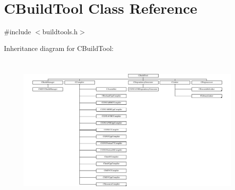 \hypertarget{classCBuildTool}{\section{C\-Build\-Tool Class Reference}
\label{classCBuildTool}
}


{\ttfamily \#include $<$buildtools.\-h$>$}

Inheritance diagram for C\-Build\-Tool\-:\begin{figure}[H]
\begin{center}
\leavevmode
\includegraphics[height=7.555555cm]{d2/ddc/classCBuildTool}
\end{center}
\end{figure}
